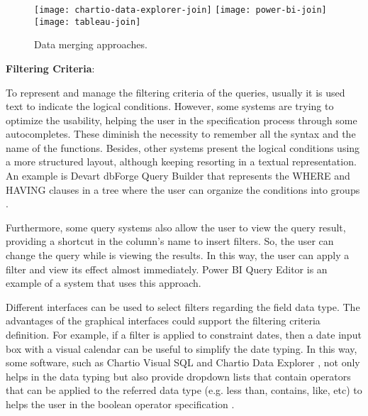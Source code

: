 \begin{figure}[tb]
    \centering
      {\texttt{[image: chartio-data-explorer-join]}}%
    {\texttt{[image: power-bi-join]}}%
    \\
      {\texttt{[image: tableau-join]}}%
  \caption{Data merging approaches.}
    \label{fig:approaches_select_data_sources}
\end{figure}

\textbf{Filtering Criteria}: 

To represent and manage the filtering criteria of the queries, usually it is used text to indicate the logical conditions. However, some systems are trying to optimize the usability, helping the user in the specification process through some autocompletes. These diminish the necessity to remember all the syntax and the name of the functions. 
Besides, other systems present the logical conditions using a more structured layout, although keeping resorting in a textual representation. An example is Devart dbForge Query Builder \cite{dbForgeQueryBuilder} that represents the WHERE and HAVING clauses in a tree where the user can organize the conditions into groups \cite{dbForgeBuildingWhereOrHavingClause}.

Furthermore, some query systems also allow the user to view the query result, providing a shortcut in the column's name to insert filters. So, the user can change the query while is viewing the results. In this way, the user can apply a filter and view its effect almost immediately. Power BI Query Editor \cite{powerBI} is an example of a system that uses this approach.

Different interfaces can be used to select filters regarding the field data type. The advantages of the graphical interfaces could support the filtering criteria definition. For example, if a filter is applied to constraint dates, then a date input box with a visual calendar can be useful to simplify the date typing. In this way, some software, such as Chartio Visual SQL \cite{chartioVisualSQL} and Chartio Data Explorer \cite{chartioDataExplorer}, not only helps in the data typing but also provide dropdown lists that contain operators that can be applied to the referred data type (e.g. less than, contains, like, etc)  to helps the user in the boolean operator specification \cite{chartioDataExplorer,visualSqlActions}.

